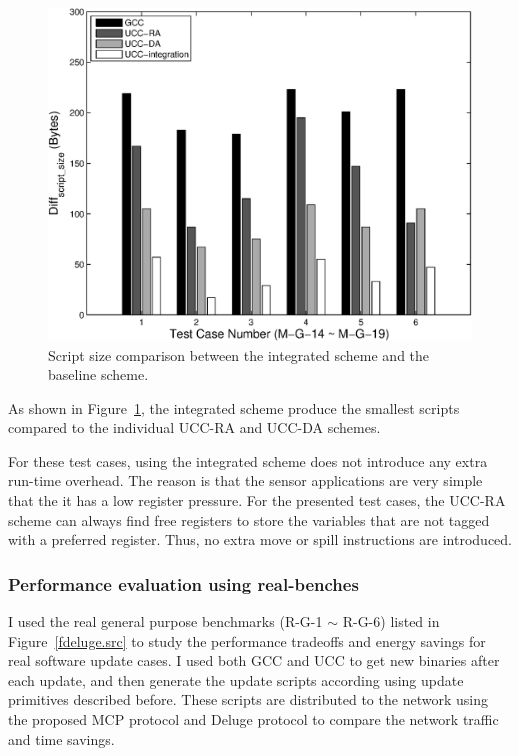 \begin{figure}[htbp]
\centering
\includegraphics[scale=0.6]{./figures/inte-upd.eps}
\caption{Script size comparison between the integrated scheme and the baseline scheme.}
\label{general-inte}
\end{figure}

As shown in Figure~\ref{general-inte}, the integrated scheme produce the
smallest scripts compared to the individual UCC-RA and UCC-DA schemes. 

For these test cases, using the integrated scheme does not introduce any extra
run-time overhead. The reason is that the sensor applications are very simple that
the it has a low register pressure. For the presented test cases, the UCC-RA scheme can 
always find free registers to store the variables that are not tagged with a preferred
register. Thus, no extra move or spill instructions are introduced.


\subsubsection{Performance evaluation using real-benches}
I used the real general purpose benchmarks (R-G-1 $\sim$ R-G-6)
listed in Figure~\ref{fdeluge.src} to study the performance tradeoffs and
energy savings for real software update cases.
I used both GCC and UCC to get new binaries after each update, and then generate the update scripts according using update primitives described before. These scripts are distributed to the network using
the proposed MCP protocol and Deluge protocol to compare the network traffic and time savings.


